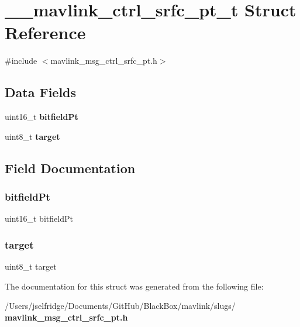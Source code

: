 \section{\+\_\+\+\_\+mavlink\+\_\+ctrl\+\_\+srfc\+\_\+pt\+\_\+t Struct Reference}
\label{struct____mavlink__ctrl__srfc__pt__t}


{\ttfamily \#include $<$mavlink\+\_\+msg\+\_\+ctrl\+\_\+srfc\+\_\+pt.\+h$>$}

\subsection*{Data Fields}
\begin{DoxyCompactItemize}
\item 
uint16\+\_\+t \textbf{ bitfield\+Pt}
\item 
uint8\+\_\+t \textbf{ target}
\end{DoxyCompactItemize}


\subsection{Field Documentation}
\mbox{\label{struct____mavlink__ctrl__srfc__pt__t_af163939b3b96e6ad92b49a9382bec3e1}} 
\subsubsection{bitfield\+Pt}
{\footnotesize\ttfamily uint16\+\_\+t bitfield\+Pt}

\mbox{\label{struct____mavlink__ctrl__srfc__pt__t_a5f333beb3be5b82c1e091308136aeb7d}} 
\subsubsection{target}
{\footnotesize\ttfamily uint8\+\_\+t target}



The documentation for this struct was generated from the following file\+:\begin{DoxyCompactItemize}
\item 
/\+Users/jselfridge/\+Documents/\+Git\+Hub/\+Black\+Box/mavlink/slugs/\textbf{ mavlink\+\_\+msg\+\_\+ctrl\+\_\+srfc\+\_\+pt.\+h}\end{DoxyCompactItemize}
